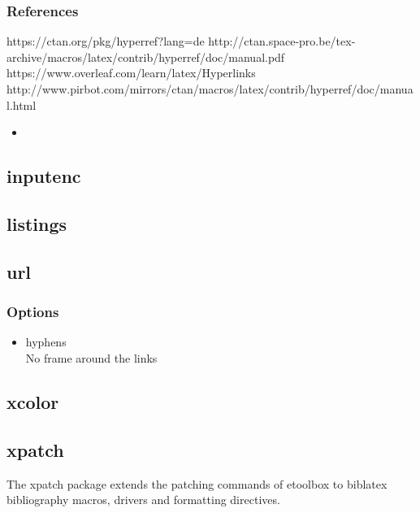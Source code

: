 \subsubsection{References}
https://ctan.org/pkg/hyperref?lang=de
http://ctan.space-pro.be/tex-archive/macros/latex/contrib/hyperref/doc/manual.pdf
https://www.overleaf.com/learn/latex/Hyperlinks
http://www.pirbot.com/mirrors/ctan/macros/latex/contrib/hyperref/doc/manual.html
\begin{itemize}
    \item{}
\end{itemize}
\subsection{inputenc}
\subsection{listings}
\subsection{url}
\subsubsection{Options}
\begin{itemize}
    \item{hyphens\\
        No frame around the links}
\end{itemize}
\subsection{xcolor}
\subsection{xpatch}
The xpatch package extends the patching commands of etoolbox to biblatex
bibliography macros, drivers and formatting directives.

